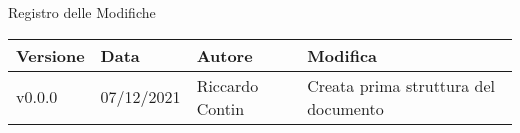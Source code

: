 \begin{center}
  \huge{Registro delle Modifiche}
\end{center}

\begin{center}
  \begin{tabular}{|p{2cm}|p{2cm}|p{3cm}|p{5cm}|}
    \hline
    \textbf{Versione} & \textbf{Data} & \textbf{Autore} & \textbf{Modifica}                    \\ \hline
    v0.0.0            & 07/12/2021    & Riccardo Contin  & Creata prima struttura del documento \\ \hline
  \end{tabular}
\end{center}
